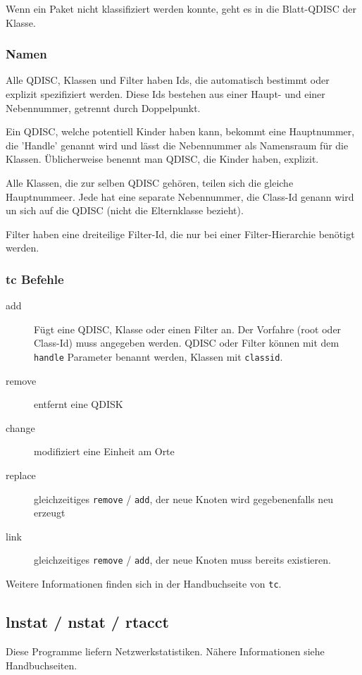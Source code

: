   Wenn ein Paket nicht klassifiziert werden konnte, geht es in die
  Blatt-QDISC der Klasse.

  \subsubsection*{Namen}
  Alle QDISC, Klassen und Filter haben Ids, die automatisch bestimmt oder
  explizit spezifiziert werden. Diese Ids bestehen aus einer Haupt- und einer
  Nebennummer, getrennt durch Doppelpunkt.

  Ein QDISC, welche potentiell Kinder haben kann, bekommt eine Hauptnummer,
  die 'Handle' genannt wird und lässt die Nebennummer als Namensraum für die
  Klassen. Üblicherweise benennt man QDISC, die Kinder haben, explizit.

  Alle Klassen, die zur selben QDISC gehören, teilen sich die gleiche
  Hauptnummeer. Jede hat eine separate Nebennummer, die Class-Id genann wird
  un sich auf die QDISC (nicht die Elternklasse bezieht).

  Filter haben eine dreiteilige Filter-Id, die nur bei einer Filter-Hierarchie
  benötigt werden.

  \subsubsection*{tc Befehle}
  \begin{description}
    \item[add] Fügt eine QDISC, Klasse oder einen Filter an. Der Vorfahre
      (root oder Class-Id) muss angegeben werden. QDISC oder Filter können mit
      dem \verb?handle? Parameter benannt werden, Klassen mit \verb?classid?.
    \item[remove] entfernt eine QDISK
    \item[change] modifiziert eine Einheit am Orte
    \item[replace] gleichzeitiges \verb?remove? / \verb?add?, der neue Knoten
      wird gegebenenfalls neu erzeugt
    \item[link] gleichzeitiges \verb?remove? / \verb?add?, der neue Knoten
      muss bereits existieren.
  \end{description}

  Weitere Informationen finden sich in der Handbuchseite von \verb?tc?.
  \subsection*{lnstat / nstat / rtacct}
  Diese Programme liefern Netzwerkstatistiken. Nähere Informationen siehe
  Handbuchseiten.

